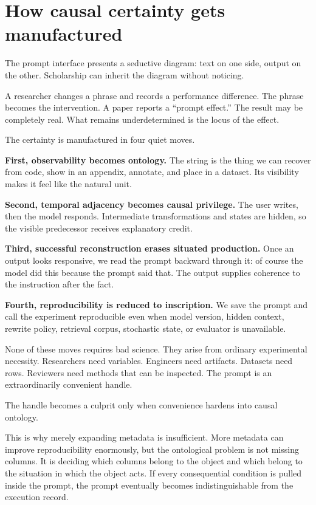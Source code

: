 \documentclass[11pt]{article}
\begin{document}
\section{How causal certainty gets manufactured}

The prompt interface presents a seductive diagram: text on one side, output on the other. Scholarship can inherit the diagram without noticing.

A researcher changes a phrase and records a performance difference. The phrase becomes the intervention. A paper reports a ``prompt effect.'' The result may be completely real. What remains underdetermined is the locus of the effect.

The certainty is manufactured in four quiet moves.

\textbf{First, observability becomes ontology.} The string is the thing we can recover from code, show in an appendix, annotate, and place in a dataset. Its visibility makes it feel like the natural unit.

\textbf{Second, temporal adjacency becomes causal privilege.} The user writes, then the model responds. Intermediate transformations and states are hidden, so the visible predecessor receives explanatory credit.

\textbf{Third, successful reconstruction erases situated production.} Once an output looks responsive, we read the prompt backward through it: of course the model did this because the prompt said that. The output supplies coherence to the instruction after the fact.

\textbf{Fourth, reproducibility is reduced to inscription.} We save the prompt and call the experiment reproducible even when model version, hidden context, rewrite policy, retrieval corpus, stochastic state, or evaluator is unavailable.

None of these moves requires bad science. They arise from ordinary experimental necessity. Researchers need variables. Engineers need artifacts. Datasets need rows. Reviewers need methods that can be inspected. The prompt is an extraordinarily convenient handle.

The handle becomes a culprit only when convenience hardens into causal ontology.

This is why merely expanding metadata is insufficient. More metadata can improve reproducibility enormously, but the ontological problem is not missing columns. It is deciding which columns belong to the object and which belong to the situation in which the object acts. If every consequential condition is pulled inside the prompt, the prompt eventually becomes indistinguishable from the execution record.
\end{document}

